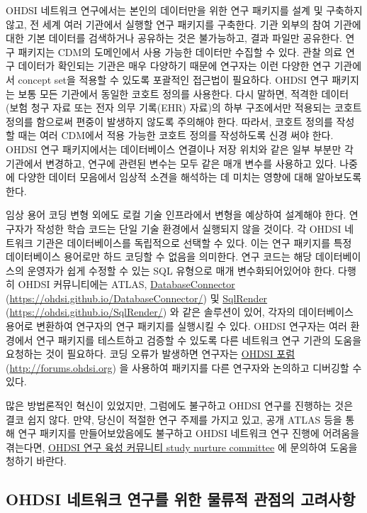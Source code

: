 \documentclass[10.5pt]{book}
\theoremstyle{definition}
\theoremstyle{definition}
\theoremstyle{definition}
\theoremstyle{remark}
\begin{document}
OHDSI 네트워크 연구에서는 본인의 데이터만을 위한 연구 패키지를 설계 및
구축하지 않고, 전 세계 여러 기관에서 실행할 연구 패키지를 구축한다. 기관
외부의 참여 기관에 대한 기본 데이터를 검색하거나 공유하는 것은
불가능하고, 결과 파일만 공유한다. 연구 패키지는 CDM의 도메인에서 사용
가능한 데이터만 수집할 수 있다. 관찰 의료 연구 데이터가 확인되는 기관은
매우 다양하기 때문에 연구자는 이런 다양한 연구 기관에서 concept set을
적용할 수 있도록 포괄적인 접근법이 필요하다. OHDSI 연구 패키지는 보통
모든 기관에서 동일한 코호트 정의를 사용한다. 다시 말하면, 적격한 데이터
(보험 청구 자료 또는 전자 의무 기록(EHR) 자료)의 하부 구조에서만
적용되는 코호트 정의를 함으로써 편중이 발생하지 않도록 주의해야 한다.
따라서, 코호트 정의를 작성할 때는 여러 CDM에서 적용 가능한 코호트 정의를
작성하도록 신경 써야 한다. OHDSI 연구 패키지에서는 데이터베이스 연결이나
저장 위치와 같은 일부 부분만 각 기관에서 변경하고, 연구에 관련된 변수는
모두 같은 매개 변수를 사용하고 있다. 나중에 다양한 데이터 모음에서
임상적 소견을 해석하는 데 미치는 영향에 대해 알아보도록 한다.

임상 용어 코딩 변형 외에도 로컬 기술 인프라에서 변형을 예상하여 설계해야
한다. 연구자가 작성한 학습 코드는 단일 기술 환경에서 실행되지 않을
것이다. 각 OHDSI 네트워크 기관은 데이터베이스를 독립적으로 선택할 수
있다. 이는 연구 패키지를 특정 데이터베이스 용어로만 하드 코딩할 수
없음을 의미한다. 연구 코드는 해당 데이터베이스의 운영자가 쉽게 수정할 수
있는 SQL 유형으로 매개 변수화되어있어야 한다. 다행히 OHDSI 커뮤니티에는
ATLAS, \protect\hyperlink{DatabaseConnector}{DatabaseConnector}
(\url{https://ohdsi.github.io/DatabaseConnector/}) 및
\protect\hyperlink{SqlRender}{SqlRender}
(\url{https://ohdsi.github.io/SqlRender/}) 와 같은 솔루션이 있어, 각자의
데이터베이스 용어로 변환하여 연구자의 연구 패키지를 실행시킬 수 있다.
OHDSI 연구자는 여러 환경에서 연구 패키지를 테스트하고 검증할 수 있도록
다른 네트워크 연구 기관의 도움을 요청하는 것이 필요하다. 코딩 오류가
발생하면 연구자는 \protect\hyperlink{ohdsi-}{OHDSI 포럼}
(\url{http://forums.ohdsi.org}) 을 사용하여 패키지를 다른 연구자와
논의하고 디버깅할 수 있다.

많은 방법론적인 혁신이 있었지만, 그럼에도 불구하고 OHDSI 연구를 진행하는
것은 결코 쉽지 않다. 만약, 당신이 적절한 연구 주제를 가지고 있고, 공개
ATLAS 등을 통해 연구 패키지를 만들어보았음에도 불구하고 OHDSI 네트워크
연구 진행에 어려움을 겪는다면,
\href{https://github.com/ohdsistudynurture/OhdsiStudyNurtureCommittee/wiki}{OHDSI
연구 육성 커뮤니티 study nurture committee} 에 문의하여 도움을 청하기
바란다.

\subsection{OHDSI 네트워크 연구를 위한 물류적 관점의
고려사항}\label{ohdsi------}
\end{document}
